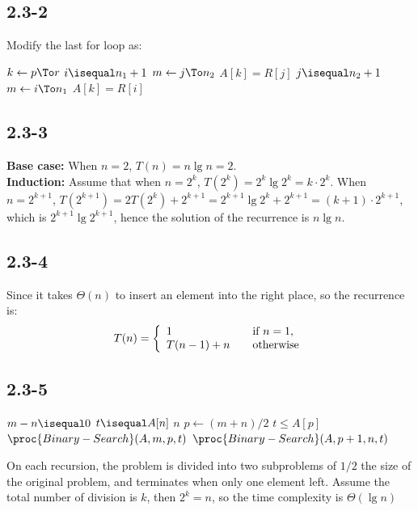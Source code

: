 \subsection{2.3-2}
    Modify the last for loop as:
    \begin{codebox}
    \li \For $k \gets p \To r$
        \Do
    \li     \If $i \isequal n_1+1$
            \Then
    \li         \For $m \gets j \To n_2$
                \Do
    \li             $A[k] = R[j]$
                \End
    \li         {}
            \End
    \li     \If $j \isequal n_2+1$
            \Then
    \li         \For $m \gets i \To n_1$
                \Do
    \li             $A[k] = R[i]$
                \End
    \li         {}
            \End
        \End
    \end{codebox}
\subsection{2.3-3}
    \textbf{Base case:} When $n=2$, $T(n)=n \lg n=2$. \\
    \textbf{Induction:} Assume that when $n=2^k$, $T(2^k)=2^k \lg 2^k=k\cdot2^k$. When $n=2^{k+1}$,
    $T(2^{k+1})=2T(2^k)+2^{k+1}=2^{k+1} \lg 2^k + 2^{k+1}=(k+1)\cdot 2^{k+1}$, which is $2^{k+1}\lg 2^{k+1}$,
    hence the solution of the recurrence is $n\lg n$.
\subsection{2.3-4}
    Since it takes $\Theta(n)$ to insert an element into the right place, so the recurrence is:
    \begin{displaymath}
        T(n) = \left\{
        \begin{array}{l l}
            1   & \quad \text{if $n=1$,}\\
            T(n-1) + n & \quad \text{otherwise}
        \end{array}
        \right.
    \end{displaymath}
\subsection{2.3-5}
    \begin{codebox}
    \li \If $m-n \isequal 0$
        \Then
    \li     \If $t \isequal A[n]$
            \Then
    \li         \Return $n$
    \li     \Else
    \li         \Return {}
            \End
        \End
    \li $p \gets (m+n)/2$
    \li \If $t \le A[p]$
        \Then
    \li     \Return $\proc{Binary-Search}(A,m,p,t)$
    \li \Else
    \li     \Return $\proc{Binary-Search}(A,p+1,n,t)$
        \End
    \end{codebox}
    On each recursion, the problem is divided into two subproblems of $1/2$ the size of the original problem, and
    terminates when only one element left. Assume the total number of division is $k$, then $2^k=n$, so the time
    complexity is $\Theta(\lg n)$
